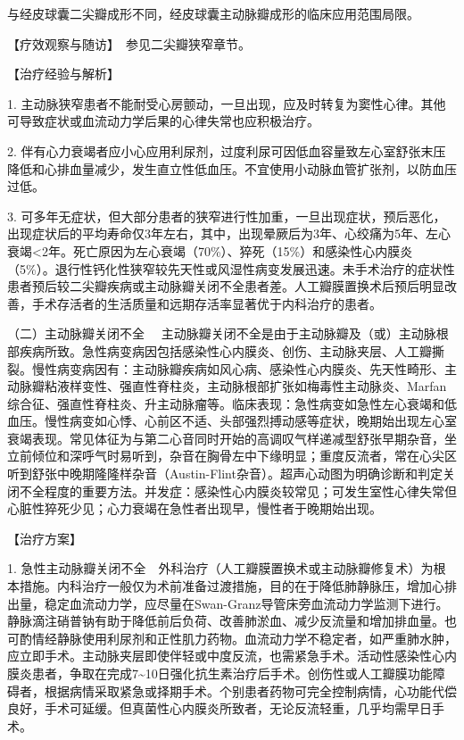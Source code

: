 与经皮球囊二尖瓣成形不同，经皮球囊主动脉瓣成形的临床应用范围局限。

【疗效观察与随访】　参见二尖瓣狭窄章节。

【治疗经验与解析】

1.
主动脉狭窄患者不能耐受心房颤动，一旦出现，应及时转复为窦性心律。其他可导致症状或血流动力学后果的心律失常也应积极治疗。

2.
伴有心力衰竭者应小心应用利尿剂，过度利尿可因低血容量致左心室舒张末压降低和心排血量减少，发生直立性低血压。不宜使用小动脉血管扩张剂，以防血压过低。

3.
可多年无症状，但大部分患者的狭窄进行性加重，一旦出现症状，预后恶化，出现症状后的平均寿命仅3年左右，其中，出现晕厥后为3年、心绞痛为5年、左心衰竭\textless{}2年。死亡原因为左心衰竭（70\%）、猝死（15\%）和感染性心内膜炎（5\%）。退行性钙化性狭窄较先天性或风湿性病变发展迅速。未手术治疗的症状性患者预后较二尖瓣疾病或主动脉瓣关闭不全患者差。人工瓣膜置换术后预后明显改善，手术存活者的生活质量和远期存活率显著优于内科治疗的患者。

{（二）主动脉瓣关闭不全}
　主动脉瓣关闭不全是由于主动脉瓣及（或）主动脉根部疾病所致。急性病变病因包括感染性心内膜炎、创伤、主动脉夹层、人工瓣撕裂。慢性病变病因有：主动脉瓣疾病如风心病、感染性心内膜炎、先天性畸形、主动脉瓣粘液样变性、强直性脊柱炎，主动脉根部扩张如梅毒性主动脉炎、Marfan综合征、强直性脊柱炎、升主动脉瘤等。临床表现：急性病变如急性左心衰竭和低血压。慢性病变如心悸、心前区不适、头部强烈搏动感等症状，晚期始出现左心室衰竭表现。常见体征为与第二心音同时开始的高调叹气样递减型舒张早期杂音，坐立前倾位和深呼气时易听到，杂音在胸骨左中下缘明显；重度反流者，常在心尖区听到舒张中晚期隆隆样杂音（Austin-Flint杂音）。超声心动图为明确诊断和判定关闭不全程度的重要方法。并发症：感染性心内膜炎较常见；可发生室性心律失常但心脏性猝死少见；心力衰竭在急性者出现早，慢性者于晚期始出现。

【治疗方案】

1.
急性主动脉瓣关闭不全　外科治疗（人工瓣膜置换术或主动脉瓣修复术）为根本措施。内科治疗一般仅为术前准备过渡措施，目的在于降低肺静脉压，增加心排出量，稳定血流动力学，应尽量在Swan-Granz导管床旁血流动力学监测下进行。静脉滴注硝普钠有助于降低前后负荷、改善肺淤血、减少反流量和增加排血量。也可酌情经静脉使用利尿剂和正性肌力药物。血流动力学不稳定者，如严重肺水肿，应立即手术。主动脉夹层即使伴轻或中度反流，也需紧急手术。活动性感染性心内膜炎患者，争取在完成7\textasciitilde{}10日强化抗生素治疗后手术。创伤性或人工瓣膜功能障碍者，根据病情采取紧急或择期手术。个别患者药物可完全控制病情，心功能代偿良好，手术可延缓。但真菌性心内膜炎所致者，无论反流轻重，几乎均需早日手术。

